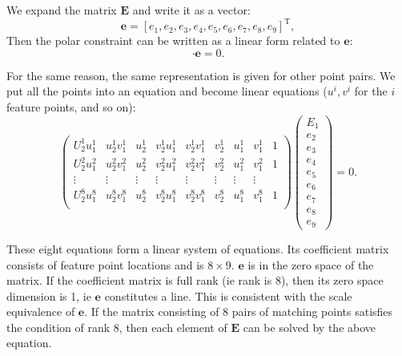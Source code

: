 We expand the matrix $\bm{E}$ and write it as a vector:
\[
\bm{e}= [e_{1}, e_{2}, e_{3}, e_{4}, e_{5}, e_{6}, e_{7}, e_{8}, e_{9 }]^{\mathrm{T}},
\]
Then the polar constraint can be written as a linear form related to $\bm{e}$:
\begin{equation}
[u_{2}u_{1}, u_{2}v_{1}, u_{2}, v_{2}u_{1}, v_{2}v_{1}, v_{2}, u_{1 },v_{1},1] \cdot \bm{e}=0.
\end{equation}

For the same reason, the same representation is given for other point pairs. We put all the points into an equation and become linear equations ($u^i, v^i$ for the $i$ feature points, and so on):
\begin{equation}
\label{Eq:eight-point}
\begin{pmatrix}
U_{2}^{1}u_{1}^{1}& u_{2}^{1}v_{1}^{1}& u_{2}^{1}& v_{2}^{1 }u_{1}^{1}& v_{2}^{1}v_{1}^{1}& v_{2}^{1} &u_{1}^{1} &v_{1}^{1 }&1\\
U_{2}^{2}u_{1}^{2}& u_{2}^{2}v_{1}^{2}& u_{2}^{2}& v_{2}^{2 }u_{1}^{2}& v_{2}^{2}v_{1}^{2}& v_{2}^{2} &u_{1}^{2} &v_{1}^{2 }&1\\
\vdots & \vdots & \vdots & \vdots & \vdots & \vdots & \vdots & \vdots \\
U_{2}^{8}u_{1}^{8}& u_{2}^{8}v_{1}^{8}& u_{2}^{8}& v_{2}^{8 }u_{1}^{8}& v_{2}^{8}v_{1}^{8}& v_{2}^{8} &u_{1}^{8}&v_{1}^{8 }&1\\
\end{pmatrix}
\begin{pmatrix}
E_{1}\\ e_{2}\\ e_{3}\\ e_{4}\\ e_{5}\\ e_{6}\\ e_{7}\\ e_{8}\\ e_{ 9}  
\end{pmatrix}
=0.
\end{equation}

These eight equations form a linear system of equations. Its coefficient matrix consists of feature point locations and is $8 \times 9$. $\bm{e}$ is in the zero space of the matrix. If the coefficient matrix is ​​full rank (ie rank is 8), then its zero space dimension is 1, ie $\bm{e}$ constitutes a line. This is consistent with the scale equivalence of $\bm{e}$. If the matrix consisting of 8 pairs of matching points satisfies the condition of rank 8, then each element of $\bm{E}$ can be solved by the above equation.

